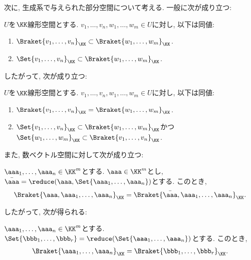 次に,
生成系で与えられた部分空間について考える.
一般に次が成り立つ:
\begin{lemma}
  \label{lem:gen:inclusion}
  $U$を$\KK$線形空間とする.
  $v_1,\ldots,v_n,w_1,\ldots,w_m\in U$に対し,
  以下は同値:
  \begin{enumerate}
  \item $\Braket{v_1,\ldots,v_n}_{\KK}\subset\Braket{w_1,\ldots,w_m}_{\KK}$.
  \item $\Set{v_1,\ldots,v_n}_{\KK}\subset\Braket{w_1,\ldots,w_m}_{\KK}$.
  \end{enumerate}
\end{lemma}
したがって,
次が成り立つ:
\begin{lemma}
  $U$を$\KK$線形空間とする.
  $v_1,\ldots,v_n,w_1,\ldots,w_m\in U$に対し,
  以下は同値:
  \begin{enumerate}
  \item $\Braket{v_1,\ldots,v_n}_{\KK}=\Braket{w_1,\ldots,w_m}_{\KK}$.
  \item $\Set{v_1,\ldots,v_n}_{\KK}\subset\Braket{w_1,\ldots,w_m}_{\KK}$かつ
    $\Set{w_1,\ldots,w_m}_{\KK}\subset\Braket{v_1,\ldots,v_n}_{\KK}$.
  \end{enumerate}
\end{lemma}
また,
数ベクトル空間に対して次が成り立つ:
\begin{lemma}
  \label{lem:samespace:reducedech}
  $\aaa_1,\ldots,\aaa_n\in\KK^m$とする.
  $\aaa\in\KK^m$とし,
  $\bar\aaa=\reduce(\aaa,\Set{\aaa_1,\ldots,\aaa_n})$とする.
  このとき,
  \begin{align*}
    \Braket{\aaa,\aaa_1,\ldots,\aaa_n}_{\KK}
    =
    \Braket{\bar\aaa,\aaa_1,\ldots,\aaa_n}_{\KK}.
  \end{align*}
\end{lemma}
したがって, 次が得られる:
\begin{lemma}
  $\aaa_1,\ldots,\aaa_n\in\KK^m$とする.
  $\Set{\bbb_1,\ldots,\bbb_r}=\reduce(\Set{\aaa_1,\ldots,\aaa_n})$とする.
  このとき,
  \begin{align*}
    \Braket{\aaa_1,\ldots,\aaa_n}_{\KK}
    =
    \Braket{\bbb_1,\ldots,\bbb_r}_{\KK}.
  \end{align*}
\end{lemma}


